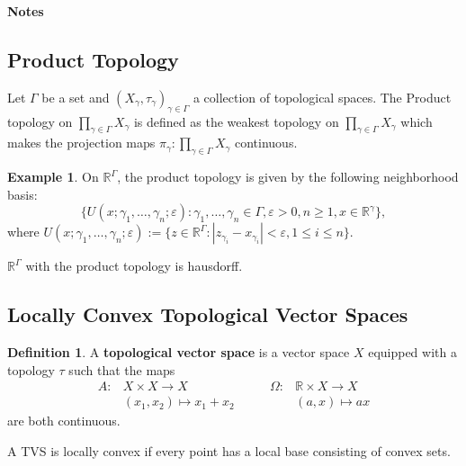 \documentclass[12pt, reqno]{article}
\theoremstyle{plain}
\theoremstyle{definition}
\newtheorem*{definition}{Definition}
\newtheorem*{example}{Example}
\theoremstyle{remark}
\renewcommand{\epsilon}{\varepsilon}
\begin{document}
\topmargin=-40pt
\renewcommand{\headrulewidth}{1pt}
\renewcommand{\headsep}{20pt}
\thispagestyle{fancy}

{\Huge \bfseries {} Notes}

\subsection*{Product Topology}

Let $\Gamma$ be a set and $(X_\gamma, \tau_\gamma)_{\gamma \in \Gamma}$ a collection of topological
spaces. The Product topology on $\prod_{\gamma \in \Gamma}X_\gamma$ is defined as the weakest topology on 
$\prod_{\gamma \in \Gamma}X_\gamma$ which makes the projection maps $\pi_\gamma: \prod_{\gamma \in \Gamma} X_\gamma$
continuous.

\begin{example}
    On $\mathbb{R}^\Gamma$, the product topology is given by the following neighborhood basis:
    \[
    \{U(x; \gamma_1, \dots, \gamma_n; \epsilon): \gamma_1, \dots,\gamma_n \in \Gamma, \epsilon > 0, n \geq 1, x \in \mathbb{R}^\gamma\},
    \]
    where $U(x; \gamma_1, \dots, \gamma_n; \epsilon) := \{z \in \mathbb{R}^\Gamma: |z_{\gamma_i} - x_{\gamma_i}| < \epsilon,
    1 \leq i \leq n\}$.

    $\mathbb{R}^\Gamma$ with the product topology is hausdorff.
\end{example}

\subsection*{Locally Convex Topological Vector Spaces}

\begin{definition}
    A \textbf{topological vector space} is a vector space $X$ equipped with a topology $\tau$ such that the maps 
    \[
    \begin{split}
        A: & X\times X \rightarrow X\\
        & (x_1, x_2) \mapsto x_1 + x_2
    \end{split} \qquad 
    \begin{split}
        \Omega: & \mathbb{R}\times X \rightarrow X\\
        & (a, x) \mapsto ax
    \end{split}
    \]
    are both continuous. 

    A TVS is locally convex if every point has a local base consisting of convex sets.
\end{definition}
\end{document}
